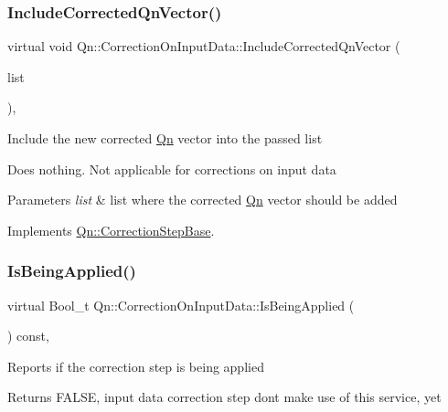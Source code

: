 \subsubsection{\texorpdfstring{Include\+Corrected\+Qn\+Vector()}{IncludeCorrectedQnVector()}}
{\footnotesize\ttfamily virtual void Qn\+::\+Correction\+On\+Input\+Data\+::\+Include\+Corrected\+Qn\+Vector (\begin{DoxyParamCaption}\item[{T\+List $\ast$}]{list }\end{DoxyParamCaption})\hspace{0.3cm}{\ttfamily [inline]}, {\ttfamily [virtual]}}

Include the new corrected \mbox{\hyperlink{namespaceQn}{Qn}} vector into the passed list

Does nothing. Not applicable for corrections on input data 
\begin{DoxyParams}{Parameters}
{\em list} & list where the corrected \mbox{\hyperlink{namespaceQn}{Qn}} vector should be added \\
\hline
\end{DoxyParams}


Implements \mbox{\hyperlink{classQn_1_1CorrectionStepBase_a5f8936b56bfe4e5a7bf1e79775241500}{Qn\+::\+Correction\+Step\+Base}}.

\mbox{\label{classQn_1_1CorrectionOnInputData_a738e13f0a496811358ad3f5b86320ffa}} 
\subsubsection{\texorpdfstring{Is\+Being\+Applied()}{IsBeingApplied()}}
{\footnotesize\ttfamily virtual Bool\+\_\+t Qn\+::\+Correction\+On\+Input\+Data\+::\+Is\+Being\+Applied (\begin{DoxyParamCaption}{ }\end{DoxyParamCaption}) const\hspace{0.3cm}{\ttfamily [inline]}, {\ttfamily [virtual]}}

Reports if the correction step is being applied \begin{DoxyReturn}{Returns}
F\+A\+L\+SE, input data correction step dont make use of this service, yet 
\end{DoxyReturn}


